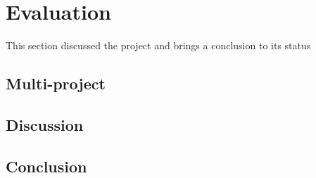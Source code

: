 \chapter{Evaluation}\label{chap:evaluation}
This section discussed the project and brings a conclusion to its status

\section{Multi-project}\label{sec:eval:multiproject}


\section{Discussion}\label{sec:eval:discussion}


\section{Conclusion}
